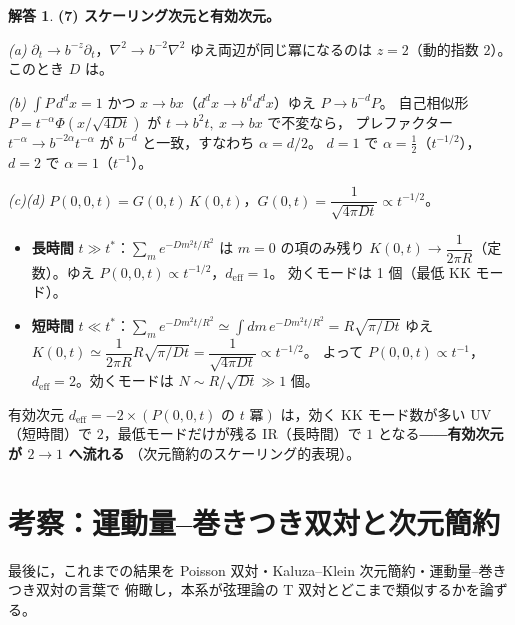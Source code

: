 \documentclass[dvipdfmx, uplatex]{jsarticle}
\theoremstyle{definition}
\newtheorem*{sol}{解答}
\begin{document}
\begin{sol}
\textbf{(7) スケーリング次元と有効次元。}

\textit{(a)} $\partial_t\to b^{-z}\partial_t$，$\nabla^2\to b^{-2}\nabla^2$ ゆえ両辺が同じ冪になるのは
$\boxed{z=2}$（動的指数 $2$）。このとき $D$ は。

\textit{(b)} $\int P\,d^dx=1$ かつ $x\to bx$（$d^dx\to b^d d^dx$）ゆえ $\boxed{P\to b^{-d}P}$。
自己相似形 $P=t^{-\alpha}\Phi(x/\sqrt{4Dt})$ が $t\to b^2t,\ x\to bx$ で不変なら，
プレファクター $t^{-\alpha}\to b^{-2\alpha}t^{-\alpha}$ が $b^{-d}$ と一致，すなわち $\boxed{\alpha=d/2}$。
$d=1$ で $\alpha=\tfrac12$（$t^{-1/2}$），$d=2$ で $\alpha=1$（$t^{-1}$）。

\textit{(c)(d)} $P(0,0,t)=G(0,t)\,K(0,t)$，$G(0,t)=\dfrac{1}{\sqrt{4\pi Dt}}\propto t^{-1/2}$。
\begin{itemize}
\item[$\bullet$] \textbf{長時間} $t\gg t^\ast$：$\sum_m e^{-Dm^2t/R^2}$ は $\boxed{m=0}$ の項のみ残り
$K(0,t)\to\dfrac{1}{2\pi R}$（定数）。ゆえ $P(0,0,t)\propto\boxed{t^{-1/2}}$，$\boxed{d_{\mathrm{eff}}=1}$。
効くモードは 1 個（最低 KK モード）。
\item[$\bullet$] \textbf{短時間} $t\ll t^\ast$：$\displaystyle\sum_m e^{-Dm^2t/R^2}\simeq\int dm\,e^{-Dm^2t/R^2}
=R\sqrt{\pi/Dt}$ ゆえ $K(0,t)\simeq\dfrac{1}{2\pi R}R\sqrt{\pi/Dt}=\dfrac{1}{\sqrt{4\pi Dt}}\propto t^{-1/2}$。
よって $P(0,0,t)\propto\boxed{t^{-1}}$，$\boxed{d_{\mathrm{eff}}=2}$。効くモードは $N\sim R/\sqrt{Dt}\gg1$ 個。
\end{itemize}
有効次元 $d_{\mathrm{eff}}=-2\times(\text{$P(0,0,t)$ の $t$ 冪})$ は，効く KK モード数が多い UV（短時間）で
$2$，最低モードだけが残る IR（長時間）で $1$ となる――\textbf{有効次元が $2\to1$ へ流れる}
（次元簡約のスケーリング的表現）。
\end{sol}

\section{考察：運動量--巻きつき双対と次元簡約}
最後に，これまでの結果を Poisson 双対・Kaluza--Klein 次元簡約・運動量--巻きつき双対の言葉で
俯瞰し，本系が弦理論の T 双対とどこまで類似するかを論ずる。
\end{document}

